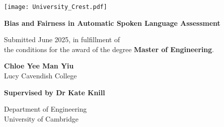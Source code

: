 \begin{titlepage}
    \begin{center}
        \vspace*{1.5cm}

        \texttt{[image: University\_Crest.pdf]}\par
        \vspace{1cm}

        {\LARGE \textbf{Bias and Fairness in Automatic Spoken Language Assessment} \par}
        \vspace{1.5cm}

        \onehalfspacing
        Submitted June 2025, in fulfillment of \\
        the conditions for the award of the degree \textbf{Master of Engineering}.
        \vspace{1cm}

        \normalsize
        \textbf{Chloe Yee Man Yiu} \\
        Lucy Cavendish College
        \vspace{1cm}

        \textbf{Supervised by Dr Kate Knill}
        \vspace{1cm}

        Department of Engineering \\
        University of Cambridge
    \end{center}
\end{titlepage}
